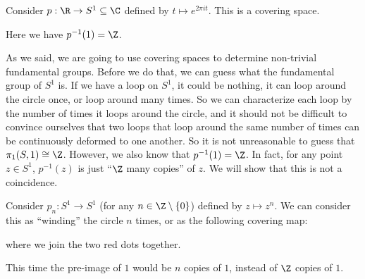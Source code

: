 \documentclass[a4paper]{article}
\begin{document}
\begin{eg}
  Consider $p: \R \to S^1\subseteq \C$ defined by $t \mapsto e^{2\pi i t}$. This is a covering space.
  \begin{center}
  \end{center}
  Here we have $p^{-1}(1) = \Z$.
\end{eg}
As we said, we are going to use covering spaces to determine non-trivial fundamental groups. Before we do that, we can guess what the fundamental group of $S^1$ is. If we have a loop on $S^1$, it could be nothing, it can loop around the circle once, or loop around many times. So we can characterize each loop by the number of times it loops around the circle, and it should not be difficult to convince ourselves that two loops that loop around the same number of times can be continuously deformed to one another. So it is not unreasonable to guess that $\pi_1(S, 1) \cong \Z$. However, we also know that $p^{-1}(1) = \Z$. In fact, for any point $z\in S^1$, $p^{-1}(z)$ is just ``$\Z$ many copies'' of $z$. We will show that this is not a coincidence.

\begin{eg}
  Consider $p_n: S^1 \to S^1$ (for any $n \in \Z\setminus\{0\}$) defined by $z \mapsto z^n$. We can consider this as ``winding'' the circle $n$ times, or as the following covering map:
  \begin{center}
  \end{center}
  where we join the two red dots together.

  This time the pre-image of $1$ would be $n$ copies of $1$, instead of $\Z$ copies of $1$.
\end{eg}
\end{document}
